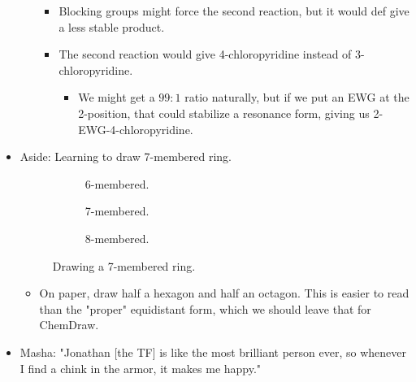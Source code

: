 \documentclass[../notes.tex]{subfiles}
\begin{document}
\begin{itemize}
\begin{itemize}
\begin{itemize}
\begin{itemize}
            \end{itemize}
            \item Blocking groups might force the second reaction, but it would def give a less stable product.
            \item The second reaction would give 4-chloropyridine instead of 3-chloropyridine.
            \begin{itemize}
                \item We might get a $99:1$ ratio naturally, but if we put an EWG at the 2-position, that could stabilize a resonance form, giving us 2-EWG-4-chloropyridine.
            \end{itemize}
        \end{itemize}
    \end{itemize}
    \item Aside: Learning to draw 7-membered ring.
    \begin{figure}[h!]
        \centering
        \footnotesize
        \begin{subfigure}[b]{0.2\linewidth}
            \centering
            \caption{6-membered.}
            \label{fig:7memberRinga}
        \end{subfigure}
        \begin{subfigure}[b]{0.2\linewidth}
            \centering
            \caption{7-membered.}
            \label{fig:7memberRingb}
        \end{subfigure}
        \begin{subfigure}[b]{0.2\linewidth}
            \centering
            \caption{8-membered.}
            \label{fig:7memberRingc}
        \end{subfigure}
        \caption{Drawing a 7-membered ring.}
        \label{fig:7memberRing}
    \end{figure}
    \begin{itemize}
        \item On paper, draw half a hexagon and half an octagon. This is easier to read than the "proper" equidistant form, which we should leave that for ChemDraw.
    \end{itemize}
    \item Masha: "Jonathan [the TF] is like the most brilliant person ever, so whenever I find a chink in the armor, it makes me happy."

\end{itemize}
\end{document}
